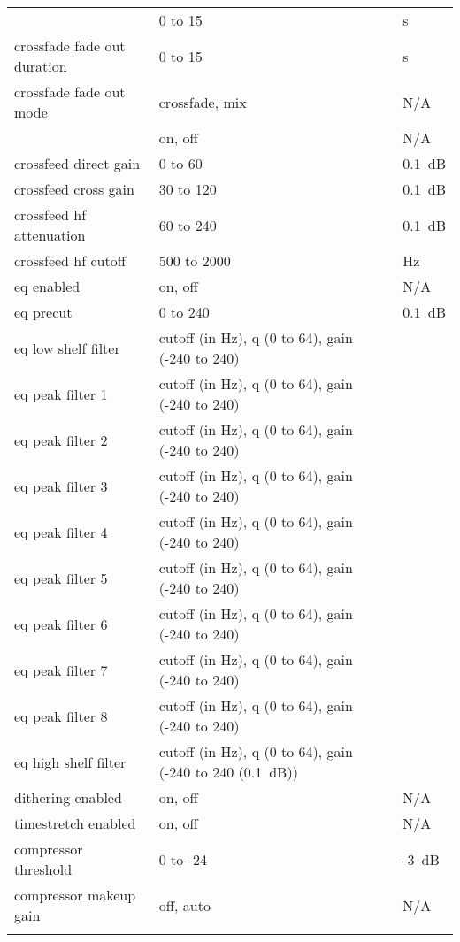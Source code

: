 \begin{center}
\begin{longtable}{>{\raggedright}p{}>{\raggedright}p{}p{}}
{{      crossfade fade in duration
                    & 0 to 15           & s\\
      crossfade fade out duration
                    & 0 to 15           & s\\
      crossfade fade out mode
                    & crossfade, mix    & N/A\\
      }
%
      crossfeed     & on, off           & N/A\\
      crossfeed direct gain
                    & 0 to 60           & 0.1~dB\\
      crossfeed cross gain
                    & 30 to 120         & 0.1~dB\\
      crossfeed hf attenuation
                    & 60 to 240         & 0.1~dB\\
      crossfeed hf cutoff
                    & 500 to 2000       & Hz\\
%
      eq enabled    & on, off           & N/A\\
      eq precut     & 0 to 240          & 0.1~dB\\
      eq low shelf filter & cutoff (in Hz), q (0 to 64), gain (-240 to 240)\\
      eq peak filter 1 & cutoff (in Hz), q (0 to 64), gain (-240 to 240)\\
      eq peak filter 2 & cutoff (in Hz), q (0 to 64), gain (-240 to 240)\\
      eq peak filter 3 & cutoff (in Hz), q (0 to 64), gain (-240 to 240)\\
      eq peak filter 4 & cutoff (in Hz), q (0 to 64), gain (-240 to 240)\\
      eq peak filter 5 & cutoff (in Hz), q (0 to 64), gain (-240 to 240)\\
      eq peak filter 6 & cutoff (in Hz), q (0 to 64), gain (-240 to 240)\\
      eq peak filter 7 & cutoff (in Hz), q (0 to 64), gain (-240 to 240)\\
      eq peak filter 8 & cutoff (in Hz), q (0 to 64), gain (-240 to 240)\\
      eq high shelf filter & cutoff (in Hz), q (0 to 64), gain (-240 to 240 (0.1~dB))\\
%
      dithering enabled & on, off       & N/A\\
%
      timestretch enabled & on, off     & N/A\\
%
      compressor threshold      & 0 to -24      & -3~dB\\
      compressor makeup gain    & off, auto     & N/A\\
}
\end{longtable}
\end{center}
